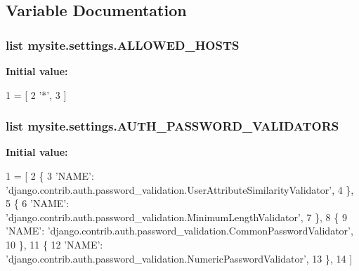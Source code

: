 \subsection{Variable Documentation}
\subsubsection[{\texorpdfstring{A\+L\+L\+O\+W\+E\+D\+\_\+\+H\+O\+S\+TS}{ALLOWED_HOSTS}}]{\setlength{\rightskip}{0pt plus 5cm}list mysite.\+settings.\+A\+L\+L\+O\+W\+E\+D\+\_\+\+H\+O\+S\+TS}\hypertarget{namespacemysite_1_1settings_ab6f4415a608815b8ca5f84d320437cf8}{}\label{namespacemysite_1_1settings_ab6f4415a608815b8ca5f84d320437cf8}
{\bfseries Initial value\+:}
\begin{DoxyCode}
1 = [
2     \textcolor{stringliteral}{'*'},
3 ]
\end{DoxyCode}
\subsubsection[{\texorpdfstring{A\+U\+T\+H\+\_\+\+P\+A\+S\+S\+W\+O\+R\+D\+\_\+\+V\+A\+L\+I\+D\+A\+T\+O\+RS}{AUTH_PASSWORD_VALIDATORS}}]{\setlength{\rightskip}{0pt plus 5cm}list mysite.\+settings.\+A\+U\+T\+H\+\_\+\+P\+A\+S\+S\+W\+O\+R\+D\+\_\+\+V\+A\+L\+I\+D\+A\+T\+O\+RS}\hypertarget{namespacemysite_1_1settings_ae1a1bb374bc9383cde47414d4aaa23bc}{}\label{namespacemysite_1_1settings_ae1a1bb374bc9383cde47414d4aaa23bc}
{\bfseries Initial value\+:}
\begin{DoxyCode}
1 = [
2     \{
3         \textcolor{stringliteral}{'NAME'}: \textcolor{stringliteral}{'django.contrib.auth.password\_validation.UserAttributeSimilarityValidator'},
4     \},
5     \{
6         \textcolor{stringliteral}{'NAME'}: \textcolor{stringliteral}{'django.contrib.auth.password\_validation.MinimumLengthValidator'},
7     \},
8     \{
9         \textcolor{stringliteral}{'NAME'}: \textcolor{stringliteral}{'django.contrib.auth.password\_validation.CommonPasswordValidator'},
10     \},
11     \{
12         \textcolor{stringliteral}{'NAME'}: \textcolor{stringliteral}{'django.contrib.auth.password\_validation.NumericPasswordValidator'},
13     \},
14 ]
\end{DoxyCode}

